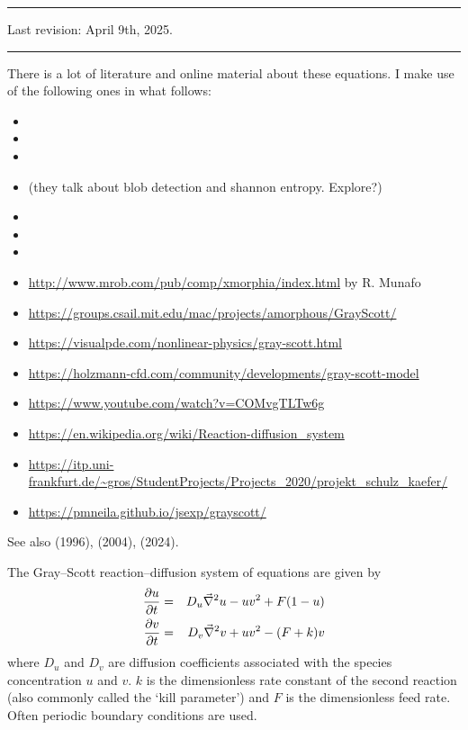\par\noindent\rule{\textwidth}{0.4pt}

Last revision: April 9th, 2025.

\par\noindent\rule{\textwidth}{0.4pt}


There is a lot of literature and online material about these equations. I make use of the following 
ones in what follows:
\begin{itemize}
\item {}
\item {}
\item {}
\item {} (they talk about blob detection and shannon entropy. Explore?)
\item {}
\item {}
\item {}
\item \url{http://www.mrob.com/pub/comp/xmorphia/index.html} by R. Munafo
\item \url{https://groups.csail.mit.edu/mac/projects/amorphous/GrayScott/}
\item \url{https://visualpde.com/nonlinear-physics/gray-scott.html}
\item \url{https://holzmann-cfd.com/community/developments/gray-scott-model}
\item \url{https://www.youtube.com/watch?v=COMvgTLTw6g}
\item \url{https://en.wikipedia.org/wiki/Reaction-diffusion_system}
\item \url{https://itp.uni-frankfurt.de/~gros/StudentProjects/Projects_2020/projekt_schulz_kaefer/}
\item \url{https://pmneila.github.io/jsexp/grayscott/}
\end{itemize}

See also \textcite{marm96} (1996), \textcite{mcri04} (2004), \textcite{jilw24} (2024).

\vspace{.6cm}

The Gray–Scott reaction–diffusion system of equations are given by
\begin{eqnarray}
\frac{\partial u}{\partial t} &=& D_u \vec\nabla^2 u - uv^2 + F(1-u) \nonumber\\
\frac{\partial v}{\partial t} &=& D_v \vec\nabla^2 v + uv^2 - (F+k)v
\end{eqnarray}
where $D_u$ and $D_v$ are diffusion coefficients associated with the species concentration $u$
and $v$. $k$ is the dimensionless rate constant of the second reaction (also commonly called the `kill 
parameter') and $F$ is the dimensionless feed rate.
Often periodic boundary conditions are used. 

